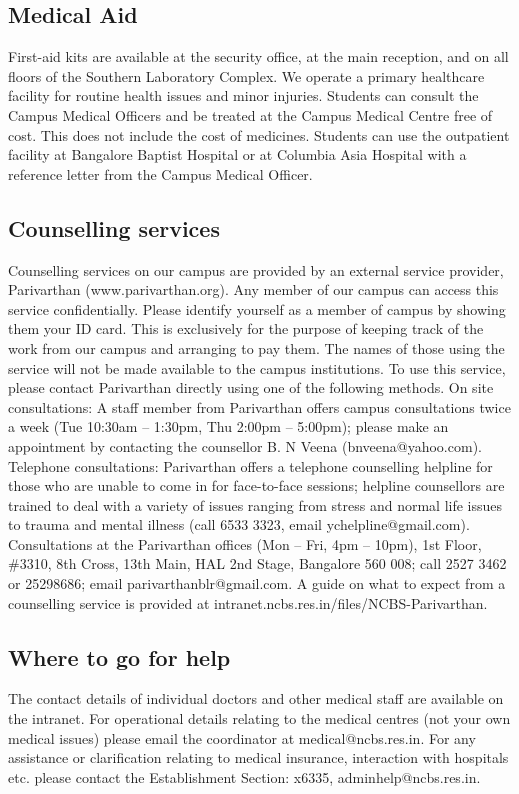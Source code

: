 \documentclass[a4paper,10pt]{article}
\begin{document}
\subsection{Medical Aid}
First-aid kits are available at the security office, at the main reception, and on
all floors of the Southern Laboratory Complex. We operate a primary healthcare facility for
routine health issues and minor injuries. Students can consult the Campus Medical Officers
and be treated at the Campus Medical Centre free of cost. This does not include the cost of
medicines. Students can use the outpatient facility at Bangalore Baptist Hospital or at
Columbia Asia Hospital with a reference letter from the Campus Medical Officer.

\subsection{Counselling services}
Counselling services on our campus are provided by an external
service provider, Parivarthan (www.parivarthan.org). Any member of our campus can
access this service confidentially. Please identify yourself as a member of campus by
showing them your ID card. This is exclusively for the purpose of keeping track of the work
from our campus and arranging to pay them. The names of those using the service will not
be made available to the campus institutions. To use this service, please contact Parivarthan
directly using one of the following methods. On site consultations: A staff member from
Parivarthan offers campus consultations twice a week (Tue 10:30am – 1:30pm, Thu 2:00pm
– 5:00pm); please make an appointment by contacting the counsellor B. N Veena
(bnveena@yahoo.com). Telephone consultations: Parivarthan offers a telephone counselling
helpline for those who are unable to come in for face-to-face sessions; helpline counsellors
are trained to deal with a variety of issues ranging from stress and normal life issues to
trauma and mental illness (call 6533 3323, email ychelpline@gmail.com). Consultations at
the Parivarthan offices (Mon – Fri, 4pm – 10pm), 1st Floor, \#3310, 8th Cross, 13th Main,
HAL 2nd Stage, Bangalore 560 008; call
2527 3462 or 25298686; email
parivarthanblr@gmail.com. A guide on what to expect from a counselling service is
provided at intranet.ncbs.res.in/files/NCBS-Parivarthan.

\subsection{Where to go for help}
The contact details of individual doctors and other medical staff are available on the
intranet. For operational details relating to the medical centres (not your own medical issues)
please email the coordinator at medical@ncbs.res.in. For any assistance or clarification
relating to medical insurance, interaction with hospitals etc. please contact the Establishment
Section: x6335, adminhelp@ncbs.res.in.
\end{document}

